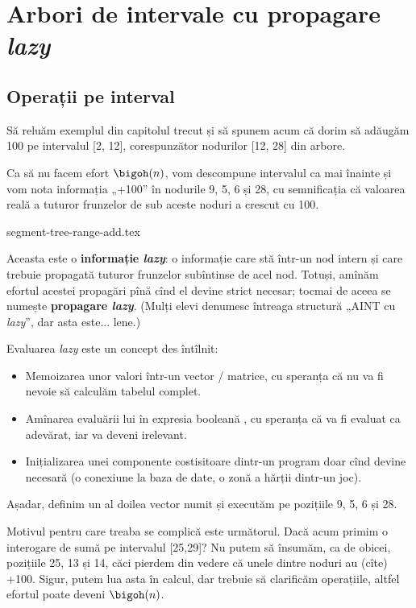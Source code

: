 \chapter{Arbori de intervale cu propagare \textit{lazy}}
\label{chapter:segment-trees-lazy}

\section{Operații pe interval}

Să reluăm exemplul din capitolul trecut și să spunem acum că dorim să adăugăm 100 pe intervalul [2, 12], corespunzător nodurilor [12, 28] din arbore.

Ca să nu facem efort $\bigoh(n)$, vom descompune intervalul ca mai înainte și vom nota informația „+100” în nodurile 9, 5, 6 și 28, cu semnificația că valoarea reală a tuturor frunzelor de sub aceste noduri a crescut cu 100.

{segment-tree-range-add.tex}

Aceasta este o \textbf{informație \textit{lazy}}: o informație care stă într-un nod intern și care trebuie propagată tuturor frunzelor subîntinse de acel nod. Totuși, amînăm efortul acestei propagări pînă cînd el devine strict necesar; tocmai de aceea se numește \textbf{propagare \textit{lazy}}. (Mulți elevi denumesc întreaga structură „AINT cu \textit{lazy}”, dar asta este... lene.)

Evaluarea \textit{lazy} este un concept des întîlnit:

\begin{itemize}
  \item Memoizarea unor valori într-un vector / matrice, cu speranța că nu va fi nevoie să calculăm tabelul complet.

  \item Amînarea evaluării lui  în expresia booleană , cu speranța că  va fi evaluat ca adevărat, iar  va deveni irelevant.

  \item Inițializarea unei componente costisitoare dintr-un program doar cînd devine necesară (o conexiune la baza de date, o zonă a hărții dintr-un joc).
\end{itemize}

Așadar, definim un al doilea vector numit  și executăm  pe pozițiile 9, 5, 6 și 28.

Motivul pentru care treaba se complică este următorul. Dacă acum primim o interogare de sumă pe intervalul [25,29]? Nu putem să însumăm, ca de obicei, pozițiile 25, 13 și 14, căci pierdem din vedere că unele dintre noduri au (cîte) +100. Sigur, putem lua asta în calcul, dar trebuie să clarificăm operațiile, altfel efortul poate deveni $\bigoh(n)$.

